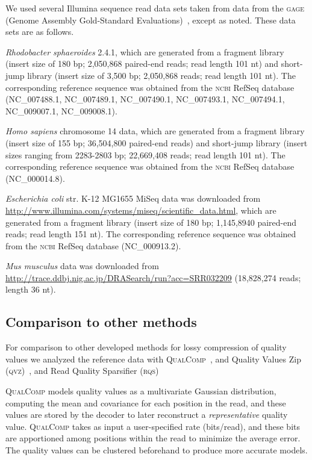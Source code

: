 \documentclass{bmcart}
\begin{document}
We used several Illumina sequence read data sets taken from data from
the \textsc{gage} (Genome Assembly Gold-Standard
Evaluations)~\cite{Salzberg:2012rc}, except as noted. These data sets
are as follows.

\textit{Rhodobacter sphaeroides} 2.4.1, which are generated from a
fragment library (insert size of 180 bp; 2,050,868 paired-end reads;
read length 101 nt) and short-jump library (insert size of 3,500 bp;
2,050,868 reads; read length 101 nt). The corresponding reference
sequence was obtained from the \textsc{ncbi} RefSeq database
(NC\_007488.1, NC\_007489.1, NC\_007490.1, NC\_007493.1, NC\_007494.1,
NC\_009007.1, NC\_009008.1).

\textit{Homo sapiens} chromosome 14 data, which are generated from a
fragment library (insert size of 155 bp; 36,504,800 paired-end reads)
and short-jump library (insert sizes ranging from 2283-2803 bp;
22,669,408 reads; read length 101 nt). The corresponding reference
sequence was obtained from the \textsc{ncbi} RefSeq database
(NC\_000014.8).

\textit{Escherichia coli} str. K-12 MG1655 MiSeq data was downloaded
from \url{http://www.illumina.com/systems/miseq/scientific_data.html},
which are generated from a fragment library (insert size of 180 bp;
1,145,8940 paired-end reads; read length 151 nt). The corresponding
reference sequence was obtained from the \textsc{ncbi} RefSeq database
(NC\_000913.2).

\textit{Mus musculus} data was downloaded from
\url{http://trace.ddbj.nig.ac.jp/DRASearch/run?acc=SRR032209}
(18,828,274 reads; length 36 nt).

\subsection*{Comparison to other methods}

For comparison to other developed methods for lossy compression of
quality values we analyzed the reference data with
\textsc{QualComp}~\cite{Ochoa:2013rt}, and Quality Values Zip
(\textsc{qvz)}~\cite{Malysa01102015}, and Read Quality Sparsifier
(\textsc{rqs})~\cite{DBLP:conf/recomb/YuYB14}

\textsc{QualComp} models quality values as a multivariate Gaussian
distribution, computing the mean and covariance for each position in
the read, and these values are stored by the decoder to later
reconstruct a \emph{representative} quality value. \textsc{QualComp}
takes as input a user-specified rate (bits/read), and these bits are
apportioned among positions within the read to minimize the average
error. The quality values can be clustered beforehand to produce more
accurate models.
\end{document}
